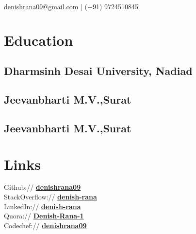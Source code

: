 \documentclass[]{denish-resume-openfont}
\begin{document}
%
%
\lastupdated

%
%
{ \href{mailto:denishrana09@gmail.com}{denishrana09@gmail.com} | (+91) 9724510845 }
%
%

\begin{minipage}[t]{0.3\textwidth}


\section{Education}

\subsection{Dharmsinh Desai \newline University, Nadiad}
\sectionsep

\subsection{Jeevanbharti M.V.,\newline Surat}
\sectionsep

\subsection{Jeevanbharti M.V.,\newline Surat}
\sectionsep



\section{Links}

Github:// \href{https://github.com/denishrana09}{\bf denishrana09} \\
StackOverflow:// \href{https://stackoverflow.com/users/8018480/denish-rana}{\bf denish-rana} \\
LinkedIn://  \href{https://www.linkedin.com/in/denish-rana/}{\bf denish-rana} \\
Quora://  \href{https://www.quora.com/profile/Denish-Rana-1}{\bf Denish-Rana-1} \\
Codechef:// \href {https://www.codechef.com/users/denishrana09}{\bf denishrana09} \\


\end{minipage}
\end{document}
